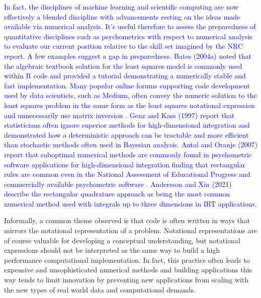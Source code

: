 \documentclass[12pt]{article}
\begin{document}
\textcolor{blue}{In fact, the disciplines of machine learning and scientific computing are now effectively a blended discipline \cite{innes} with advancements resting on the ideas made available via numerical analysis. It's useful therefore to assess the preparedness of quantitative disciplines such as psychometrics with respect to numerical analysis to evaluate our current position relative to the skill set imagined by the NRC report. A few examples suggest a gap in preparedness. Bates (2004a)\nocite{Rnews:Bates:2004} noted that the algebraic textbook solution for the least squares model is commonly used within R code and provided a tutorial demonstrating a numerically stable and fast implementation. Many popular online forums supporting code development used by data scientists, such as Medium, often convey the numeric solution to the least squares problem in the same form as the least squares notational expression and unnecessarily use matrix inversion \cite{Koseoglu}. Genz and Kass (1997) report that statisticians often ignore superior methods for high-dimensional integration and demonstrated how a deterministic approach can be tractable and more efficient than stochastic methods often used in Bayesian analysis. Antal and Oranje (2007) report that suboptimal numerical methods are commonly found in psychometric software applications for high-dimensional integration finding that rectangular rules are common even in the National Assessment of Educational Progress \cite{nces} and commercially available psychometric software \cite{parscale}. Andersson and Xin (2021) describe the rectangular quadrature approach as being the most common numerical method used with integrals up to three dimensions in IRT applications.} \nocite{genz,ets:2007} \nocite{bjorn}

Informally, a common theme observed is that code is often written in ways that mirrors the notational representation of a problem. Notational representations are of course valuable for developing a conceptual understanding, but notational expressions should not be interpreted as the same way to build a high performance computational implementation. In fact, this practice often leads to expensive and unsophisticated numerical methods and building applications this way tends to limit innovation by preventing new applications from scaling with the new types of real world data and computational demands. 
\end{document}
